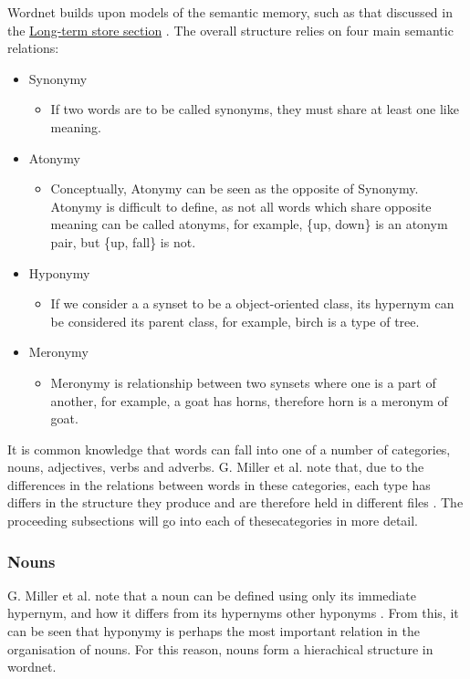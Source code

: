 \documentclass[]{article}
\begin{document}
Wordnet builds upon models of the semantic memory, such as that discussed in the \hyperref[LongTerm]{Long-term store section} \cite{WN1Introduction}. The overall structure relies on four main semantic relations:

\begin{itemize}
	\item Synonymy
	\begin{itemize}
		\item If two words are to be called synonyms, they must share at least one like meaning.
	\end{itemize}
	
	\item Atonymy \label{Atonym}
	\begin{itemize}
		\item Conceptually, Atonymy can be seen as the opposite of Synonymy. Atonymy is difficult to define, as not all words which share opposite meaning can be called atonyms, for example, \{up, down\} is an atonym pair, but \{up, fall\} is not.
	\end{itemize}
	
	\item Hyponymy
	\begin{itemize}
		\item If we consider a a synset to be a object-oriented class, its hypernym can be considered its parent class, for example, birch is a type of tree.
	\end{itemize}
	
	\item Meronymy \label{Meronym}
	\begin{itemize}
		\item Meronymy is relationship between two synsets where one is a part of another, for example, a goat has horns, therefore horn is a meronym of goat.
	\end{itemize}
	
\end{itemize}

It is common knowledge that words can fall into one of a number of categories, nouns, adjectives, verbs and adverbs. G. Miller et al. note that, due to the differences in the relations between words in these categories, each type has differs in the structure they produce and are therefore held in different files \cite{WN1Introduction}. The proceeding subsections will go into each of thesecategories in more detail.

\subsubsection{Nouns}
\label{Nouns}
G. Miller et al. note that a noun can be defined using only its immediate hypernym, and how it differs from its hypernyms other hyponyms \cite{WN2Nouns}. From this, it can be seen that hyponymy is perhaps the most important relation in the organisation of nouns. For this reason, nouns form a hierachical structure in wordnet.
\end{document}

